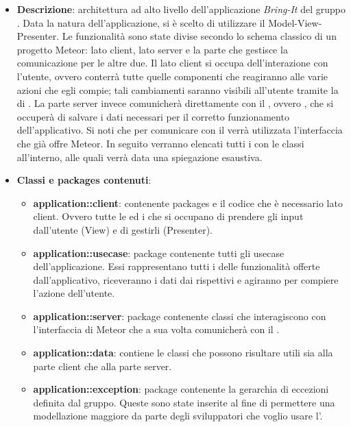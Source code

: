 \begin{itemize}

	\item \textbf{Descrizione}: architettura ad alto livello dell’applicazione \textit{Bring-It} del gruppo \gruppo. Data la natura dell'applicazione, si è scelto di utilizzare il  Model-View-Presenter. Le funzionalità sono state divise secondo lo schema classico di un progetto Meteor: lato client, lato server e la parte che gestisce la comunicazione per le altre due. Il lato client si occupa dell'interazione con l'utente, ovvero conterrà tutte quelle componenti che reagiranno alle varie azioni che egli compie; tali cambiamenti saranno visibili all'utente tramite la  di . La parte server invece comunicherà direttamente con il , ovvero , che si occuperà di salvare i dati necessari per il corretto funzionamento dell'applicativo. Si noti che per comunicare con il  verrà utilizzata l'interfaccia che già offre Meteor.
In seguito verranno elencati tutti i  con le classi all'interno, alle quali verrà data una spiegazione esaustiva.
	\item \textbf{Classi e packages contenuti}:
	\begin{itemize}
		\item \textbf{application::client}:  contenente packages e il codice che è necessario lato client. Ovvero tutte le  ed i  che si occupano di prendere gli input dall'utente (View) e di gestirli (Presenter).
		\item \textbf{application::usecase}: package contenente tutti gli usecase dell'applicazione. Essi rappresentano tutti i  delle funzionalità offerte dall'applicativo, riceveranno i dati dai rispettivi  e agiranno per compiere l'azione dell'utente.
		\item \textbf{application::server}: package contenente classi che interagiscono con l'interfaccia di Meteor che a sua volta comunicherà con il  .
		\item \textbf{application::data}: contiene le classi che possono risultare utili sia alla parte client che alla parte server.
		\item \textbf{application::exception}: package contenente la gerarchia di eccezioni definita dal gruppo. Queste sono state inserite al fine di permettere una modellazione maggiore da parte degli sviluppatori che voglio usare l'.

\end{itemize}
\end{itemize}
